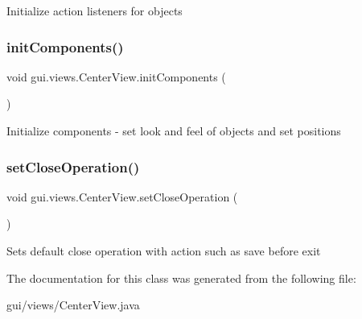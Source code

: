 Initialize action listeners for objects \mbox{\label{classgui_1_1views_1_1_center_view_a88ac8cd9a5762534aa61168112bd8052}} 
\subsubsection{\texorpdfstring{init\+Components()}{initComponents()}}
{\footnotesize\ttfamily void gui.\+views.\+Center\+View.\+init\+Components (\begin{DoxyParamCaption}{ }\end{DoxyParamCaption})\hspace{0.3cm}{\ttfamily [inline]}}

Initialize components -\/ set look and feel of objects and set positions \mbox{\label{classgui_1_1views_1_1_center_view_ae7ef58a077715b2730fca4ca104f420f}} 
\subsubsection{\texorpdfstring{set\+Close\+Operation()}{setCloseOperation()}}
{\footnotesize\ttfamily void gui.\+views.\+Center\+View.\+set\+Close\+Operation (\begin{DoxyParamCaption}{ }\end{DoxyParamCaption})\hspace{0.3cm}{\ttfamily [inline]}}

Sets default close operation with action such as save before exit 

The documentation for this class was generated from the following file\+:\begin{DoxyCompactItemize}
\item 
gui/views/Center\+View.\+java\end{DoxyCompactItemize}
